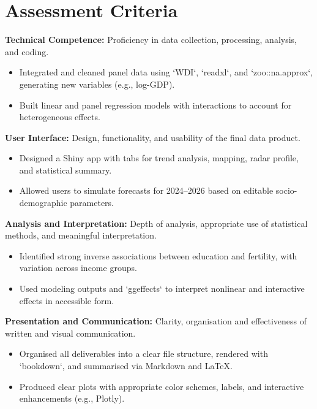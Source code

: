 \documentclass[a4paper, 12pt]{article}
\begin{document}
\section{Assessment Criteria}

\textbf{Technical Competence:} Proficiency in data collection, processing, analysis, and coding.

\begin{itemize}
    \item Integrated and cleaned panel data using `WDI`, `readxl`, and `zoo::na.approx`, generating new variables (e.g., log-GDP).
    \item Built linear and panel regression models with interactions to account for heterogeneous effects.
\end{itemize}

\textbf{User Interface:} Design, functionality, and usability of the final data product.

\begin{itemize}
    \item Designed a Shiny app with tabs for trend analysis, mapping, radar profile, and statistical summary.
    \item Allowed users to simulate forecasts for 2024–2026 based on editable socio-demographic parameters.
\end{itemize}

\textbf{Analysis and Interpretation:} Depth of analysis, appropriate use of statistical methods, and meaningful interpretation.

\begin{itemize}
    \item Identified strong inverse associations between education and fertility, with variation across income groups.
    \item Used modeling outputs and `ggeffects` to interpret nonlinear and interactive effects in accessible form.
\end{itemize}

\textbf{Presentation and Communication:} Clarity, organisation and effectiveness of written and visual communication.

\begin{itemize}
    \item Organised all deliverables into a clear file structure, rendered with `bookdown`, and summarised via Markdown and LaTeX.
    \item Produced clear plots with appropriate color schemes, labels, and interactive enhancements (e.g., Plotly).
\end{itemize}
\end{document}

